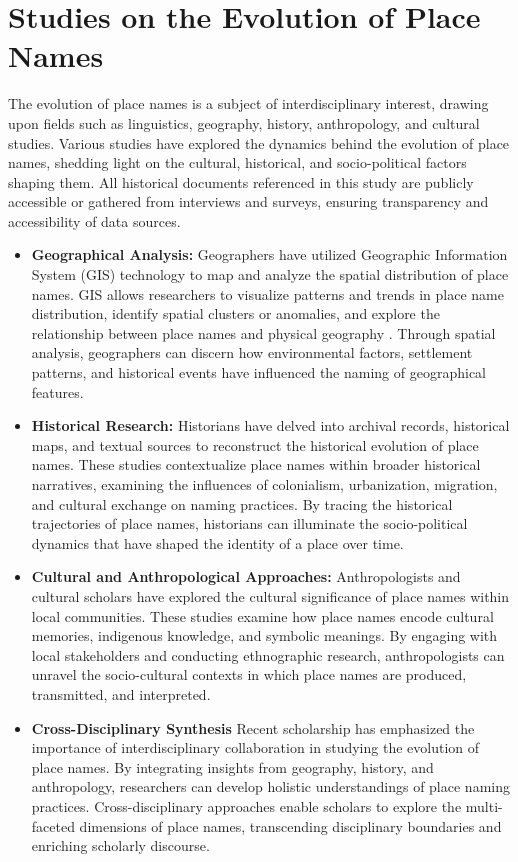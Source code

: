 \section{Studies on the Evolution of Place Names}
The evolution of place names is a subject of interdisciplinary interest, drawing upon fields such as linguistics, geography, history, anthropology, and cultural studies. Various studies have explored the dynamics behind the evolution of place names, shedding light on the cultural, historical, and socio-political factors shaping them. All historical documents referenced in this study are publicly accessible or gathered from interviews and surveys, ensuring transparency and accessibility of data sources.
\begin{itemize}
 \item \textbf{Geographical Analysis:}
Geographers have utilized Geographic Information System (GIS) technology to map and analyze the spatial distribution of place names. GIS allows researchers to visualize patterns and trends in place name distribution, identify spatial clusters or anomalies, and explore the relationship between place names and physical geography \cite{Bolstad}. Through spatial analysis, geographers can discern how environmental factors, settlement patterns, and historical events have influenced the naming of geographical features.
	\item \textbf{Historical Research:}
Historians have delved into archival records, historical maps, and textual sources to reconstruct the historical evolution of place names. These studies contextualize place names within broader historical narratives, examining the influences of colonialism, urbanization, migration, and cultural exchange on naming practices. By tracing the historical trajectories of place names, historians can illuminate the socio-political dynamics that have shaped the identity of a place over time.
	\item \textbf{Cultural and Anthropological Approaches:}
Anthropologists and cultural scholars have explored the cultural significance of place names within local communities. These studies examine how place names encode cultural memories, indigenous knowledge, and symbolic meanings\cite{Gelling}. By engaging with local stakeholders and conducting ethnographic research, anthropologists can unravel the socio-cultural contexts in which place names are produced, transmitted, and interpreted.
	\item \textbf{Cross-Disciplinary Synthesis}
Recent scholarship has emphasized the importance of interdisciplinary collaboration in studying the evolution of place names. By integrating insights from  geography, history, and anthropology, researchers can develop holistic understandings of place naming practices\cite{Bolstad}. Cross-disciplinary approaches enable scholars to explore the multi-faceted dimensions of place names, transcending disciplinary boundaries and enriching scholarly discourse.

\end{itemize}

